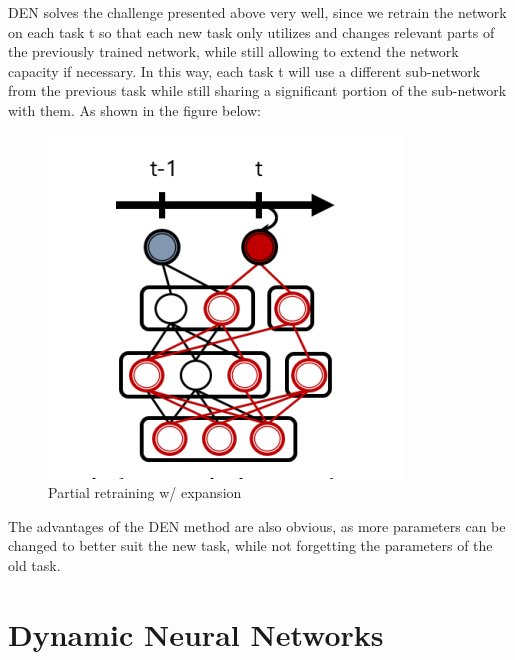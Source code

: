 DEN solves the challenge presented above very well, since we retrain the network on each task t so that each new task only utilizes and changes relevant parts of the previously trained network, while still allowing to extend the network capacity if necessary. In this way, each task t will use a different sub-network from the previous task while still sharing a significant portion of the sub-network with them. As shown in the figure below:
\begin{figure}[H]
	\centering
	\includegraphics[width=1\linewidth]{figures_ning/den}
	\caption[Partial retraining w/ expansion]{Partial retraining w/ expansion}
	\label{fig:den}
\end{figure}

The advantages of the DEN method are also obvious, as more parameters can be changed to better suit the new task, while not forgetting the parameters of the old task.

\section{Dynamic Neural Networks}

